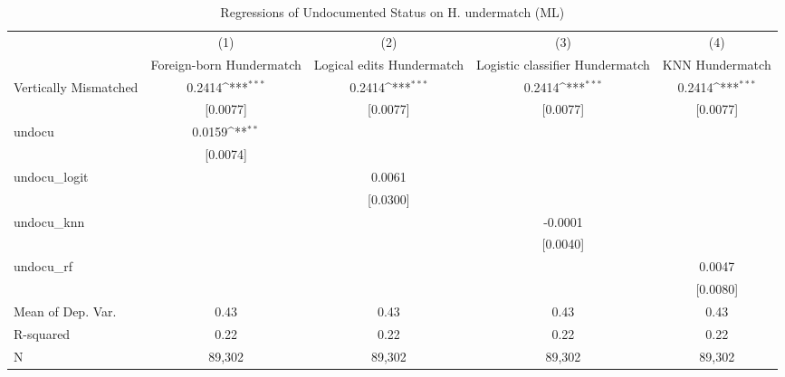 \begin{table}[htbp]\centering
\def\sym#1{\ifmmode^{#1}\else\(^{#1}\)\fi}
\caption{Regressions of Undocumented Status on H. undermatch (ML)}
\begin{tabular}{l*{4}{c}}
\toprule
                    &\multicolumn{1}{c}{(1)}         &\multicolumn{1}{c}{(2)}         &\multicolumn{1}{c}{(3)}         &\multicolumn{1}{c}{(4)}         \\
                    &Foreign-born Hundermatch         &Logical edits Hundermatch         &Logistic classifier Hundermatch         &KNN Hundermatch         \\
\midrule
Vertically Mismatched&      0.2414\sym{***}&      0.2414\sym{***}&      0.2414\sym{***}&      0.2414\sym{***}\\
                    &    [0.0077]         &    [0.0077]         &    [0.0077]         &    [0.0077]         \\
\addlinespace
undocu              &      0.0159\sym{**} &                     &                     &                     \\
                    &    [0.0074]         &                     &                     &                     \\
\addlinespace
undocu\_logit        &                     &      0.0061         &                     &                     \\
                    &                     &    [0.0300]         &                     &                     \\
\addlinespace
undocu\_knn          &                     &                     &     -0.0001         &                     \\
                    &                     &                     &    [0.0040]         &                     \\
\addlinespace
undocu\_rf           &                     &                     &                     &      0.0047         \\
                    &                     &                     &                     &    [0.0080]         \\
\midrule
Mean of Dep. Var.   &        0.43         &        0.43         &        0.43         &        0.43         \\
R-squared           &        0.22         &        0.22         &        0.22         &        0.22         \\
N                   &      89,302         &      89,302         &      89,302         &      89,302         \\

\end{tabular}
\end{table}
